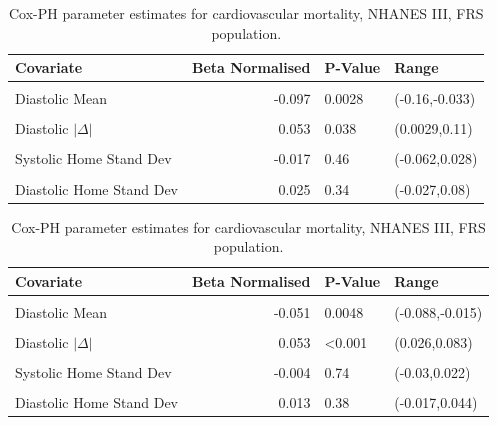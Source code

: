 \documentclass[
]{article}
\begin{document}
\begin{table}[!h]
\centering
\caption{\label{tab:freqCVDNF}Cox-PH parameter estimates for cardiovascular mortality, NHANES III, FRS population.}
\centering
\begin{tabular}[t]{lrll}
\toprule
Covariate & Beta Normalised & P-Value & Range\\
\midrule
\cellcolor{gray!10}{Systolic Mean} & \cellcolor{gray!10}{0.312} & \cellcolor{gray!10}{<0.001} & \cellcolor{gray!10}{(0.25,0.37)}\\
Diastolic Mean & -0.097 & 0.0028 & (-0.16,-0.033)\\
\cellcolor{gray!10}{Systolic $|\Delta|$} & \cellcolor{gray!10}{0.065} & \cellcolor{gray!10}{0.0025} & \cellcolor{gray!10}{(0.023,0.11)}\\
Diastolic $|\Delta|$ & 0.053 & 0.038 & (0.0029,0.11)\\
\cellcolor{gray!10}{Systolic Clinic Stand Dev} & \cellcolor{gray!10}{-0.008} & \cellcolor{gray!10}{0.72} & \cellcolor{gray!10}{(-0.054,0.036)}\\
Systolic Home Stand Dev & -0.017 & 0.46 & (-0.062,0.028)\\
\cellcolor{gray!10}{Diastolic Clinic Stand Dev} & \cellcolor{gray!10}{-0.027} & \cellcolor{gray!10}{0.3} & \cellcolor{gray!10}{(-0.08,0.025)}\\
Diastolic Home Stand Dev & 0.025 & 0.34 & (-0.027,0.08)\\
\bottomrule
\end{tabular}
\end{table}

\begin{table}[!h]
\centering
\caption{\label{tab:freqALLNF}Cox-PH parameter estimates for cardiovascular mortality, NHANES III, FRS population.}
\centering
\begin{tabular}[t]{lrll}
\toprule
Covariate & Beta Normalised & P-Value & Range\\
\midrule
\cellcolor{gray!10}{Systolic Mean} & \cellcolor{gray!10}{0.166} & \cellcolor{gray!10}{<0.001} & \cellcolor{gray!10}{(0.13,0.19)}\\
Diastolic Mean & -0.051 & 0.0048 & (-0.088,-0.015)\\
\cellcolor{gray!10}{Systolic $|\Delta|$} & \cellcolor{gray!10}{0.047} & \cellcolor{gray!10}{<0.001} & \cellcolor{gray!10}{(0.022,0.07)}\\
Diastolic $|\Delta|$ & 0.053 & <0.001 & (0.026,0.083)\\
\cellcolor{gray!10}{Systolic Clinic Stand Dev} & \cellcolor{gray!10}{-0.009} & \cellcolor{gray!10}{0.49} & \cellcolor{gray!10}{(-0.036,0.017)}\\
Systolic Home Stand Dev & -0.004 & 0.74 & (-0.03,0.022)\\
\cellcolor{gray!10}{Diastolic Clinic Stand Dev} & \cellcolor{gray!10}{-0.005} & \cellcolor{gray!10}{0.72} & \cellcolor{gray!10}{(-0.033,0.023)}\\
Diastolic Home Stand Dev & 0.013 & 0.38 & (-0.017,0.044)\\
\bottomrule
\end{tabular}
\end{table}
\end{document}
